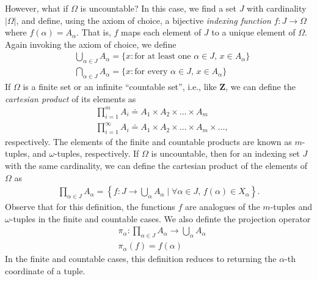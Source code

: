 However, what if $\Omega$ is uncountable? In this case, we find a set $J$ with
cardinality $|\Omega|$, and define, using the axiom of choice, a bijective \emph{indexing function} $f: J
\to \Omega$ where $f(\alpha) = A_{\alpha}$. That is, $f$ maps each element of
$J$ to a unique element of $\Omega$. Again invoking the axiom of choice,
we define
\begin{equation*}
	\begin{split}
		& \bigcup_{\alpha \in J} A_{\alpha} = \{ x: \text{for at least one $\alpha \in
		J$, $x \in A_{\alpha}$}\} \\
		& \bigcap_{\alpha \in J} A_{\alpha} = \{ x: \text{for every $\alpha \in
		J$, $x \in A_{\alpha}$}\}
	\end{split}
\end{equation*}
If $\Omega$ is a finite set or an infinite ``countable set'', i.e., like $\mathbf{Z}$,
we can define the \emph{cartesian product} of its elements as
\begin{equation*}
	\begin{split}
		& \prod_{i=1}^{m} A_{i} \doteq A_{1} \times A_{2} \times \dots \times A_{m} \\
		& \prod_{i =1}^{\infty} A_{i} \doteq A_{1} \times A_{2} \times \dots \times
		A_{m} \times \dots,
	\end{split}
\end{equation*}
respectively. The elements of the finite and countable products are known as
$m$-tuples, and $\omega$-tuples, respectively.
If $\Omega$ is uncountable, then for an indexing set $J$ with the same
cardinality, we can define the cartesian product of the elements of $\Omega$
as
\begin{equation*}
	\begin{split}
		\prod_{\alpha \in J} A_{\alpha} = \left\{ f: J \to \bigcup_{\alpha} A_{\alpha} \mid
		\forall \alpha \in J, \, f(\alpha) \in X_{\alpha}\right\}.
	\end{split}
\end{equation*}
Observe that for this definition, the functions $f$ are analogues of the
$m$-tuples and $\omega$-tuples in the finite and countable cases.
We also definte the projection operator
\begin{equation*}
	\begin{split}
		& \pi_{\alpha}: \prod_{\alpha \in J} A_{\alpha} \to \bigcup_{\alpha}
		A_{\alpha} \\
		& \pi_{\alpha}(f) = f(\alpha)
	\end{split}
\end{equation*}
In the finite and countable cases, this definition reduces to returning
the $\alpha$-th coordinate of a tuple.
